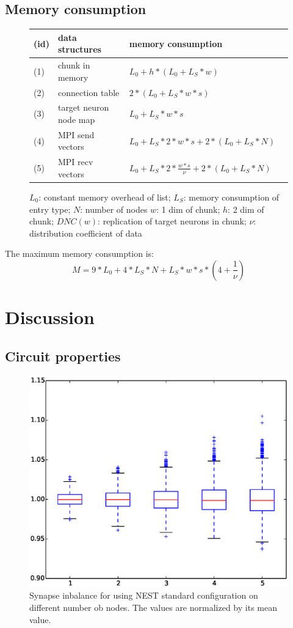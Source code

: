 \documentclass[a4paper]{article}
\begin{document}
\subsection{Memory consumption}
\begin{figure}[ht!]
\begin{tabular}{| l | l | l | l |}
    \hline
    (id) & data structures & memory consumption \\ \hline
    (1) & chunk in memory & $L_0 + h*(L_0 + L_S*w)$ \\ \hline
    (2) & connection table & $2*(L_0+L_S*w*s)$ \\ \hline
    (3) & target neuron node map & $L_0+L_S*w*s$ \\ \hline
    (4) & MPI send vectors & $L_0+L_S*2*w*s+2*(L_0+L_S*N)$ \\ \hline
    (5) & MPI recv vectors & $L_0+L_S*2*\frac{w*s}{\nu}+2*(L_0+L_S*N)$ \\ \hline
    \end{tabular}
\caption{$L_0$: constant memory overhead of list; $L_S$: memory consumption of entry type; $N$: number of nodes $w$: 1 dim of chunk; $h$: 2 dim of chunk; $DNC(w)$: replication of target neurons in chunk; $\nu$: distribution coefficient of data}
\end{figure}
The maximum memory consumption is:
\begin{equation}
  M = 9*L_0 + 4*L_S*N+L_S*w*s*(4+\frac{1}{\nu})
  \label{eq:maxmemoryconsumption}
\end{equation}

\newpage
\section{Discussion}
\subsection{Circuit properties}

\begin{figure}[ht!]
\centering
\includegraphics[scale=0.4]{full_circuit_rack_distribution.eps}
\caption{Synapse inbalance for using NEST standard configuration on different number ob nodes. The values are normalized by its mean value.}
\end{figure}
\end{document}
